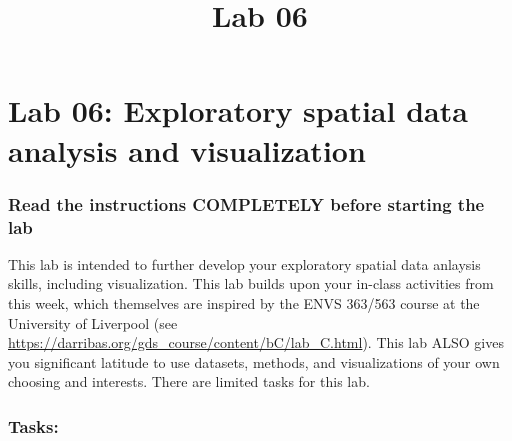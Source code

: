 \documentclass[]{article}
\title{Lab 06}
\author{}
\date{}
\makeatletter
\renewcommand{\maketitle}{\bgroup\vspace*{-1cm}\setlength{\parindent}{0pt}
\begin{flushleft}
  \@author
  
  \@date
  
\end{flushleft}\egroup
}
\makeatother
\begin{document}
\maketitle

\hypertarget{lab-06-exploratory-spatial-data-analysis-and-visualization}{%
\section{Lab 06: Exploratory spatial data analysis and
visualization}\label{lab-06-exploratory-spatial-data-analysis-and-visualization}}

\hypertarget{read-the-instructions-completely-before-starting-the-lab}{%
\subsubsection{Read the instructions COMPLETELY before starting the
lab}\label{read-the-instructions-completely-before-starting-the-lab}}

This lab is intended to further develop your exploratory spatial data
anlaysis skills, including visualization. This lab builds upon your
in-class activities from this week, which themselves are inspired by the
ENVS 363/563 course at the University of Liverpool (see
\url{https://darribas.org/gds_course/content/bC/lab_C.html}). This lab
ALSO gives you significant latitude to use datasets, methods, and
visualizations of your own choosing and interests. There are limited
tasks for this lab.

\hypertarget{tasks}{%
\subsubsection{Tasks:}\label{tasks}}
\end{document}
